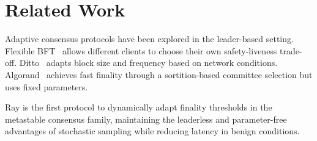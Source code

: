 \section{Related Work}

\label{sec:ray-related}

Adaptive consensus protocols have been explored in the leader-based setting.
Flexible BFT~\cite{malkhi2019flexible} allows different clients to choose their own
safety-liveness trade-off. Ditto~\cite{gelashvili2022ditto} adapts block size and
frequency based on network conditions. Algorand~\cite{gilad2017algorand} achieves
fast finality through a sortition-based committee selection but uses fixed parameters.

Ray is the first protocol to dynamically adapt finality thresholds in the metastable
consensus family, maintaining the leaderless and parameter-free advantages of
stochastic sampling while reducing latency in benign conditions.


